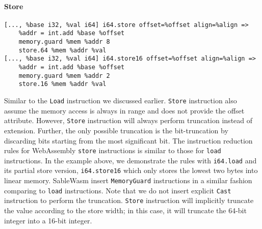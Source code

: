 \paragraph{Store} \quad
\begin{lstlisting}[basicstyle=\linespread{1}\small, language=SableWasmMIR]
[..., %base i32, %val i64] i64.store offset=%offset align=%align =>
    %addr = int.add %base %offset
    memory.guard %mem %addr 8
    store.64 %mem %addr %val
[..., %base i32, %val i64] i64.store16 offset=%offset align=%align =>
    %addr = int.add %base %offset
    memory.guard %mem %addr 2
    store.16 %mem %addr %val
\end{lstlisting}
Similar to the \texttt{Load} instruction we discussed earlier. \texttt{Store} instruction also assume the memory access is always in range and does not provide the offset attribute. However, \texttt{Store} instruction will always perform truncation instead of extension. Further, the only possible truncation is the bit-truncation by discarding bits starting from the most significant bit. The instruction reduction rules for WebAssembly \texttt{store} instructions is similar to those for \texttt{load} instructions. In the example above, we demonstrate the rules with \texttt{i64.load} and its partial store version, \texttt{i64.store16} which only stores the lowest two bytes into linear memory. SableWasm insert \texttt{MemoryGuard} instructions in a similar fashion comparing to \texttt{load} instructions. Note that we do not insert explicit \texttt{Cast} instruction to perform the truncation. \texttt{Store} instruction will implicitly truncate the value according to the store width; in this case, it will truncate the 64-bit integer into a 16-bit integer.

